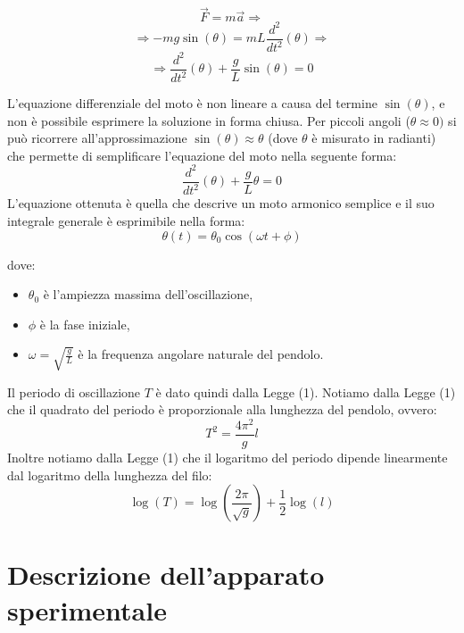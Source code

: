 \documentclass[11pt]{article}
\begin{document}
$$\overrightarrow{F}=m\overrightarrow{a}\Rightarrow$$
$$\Rightarrow-mg\sin(\theta)=mL\frac{d^2}{dt^2}(\theta)\Rightarrow$$
\begin{equation}
    \Rightarrow \frac{d^2}{dt^2}(\theta)+\frac{g}{L}\sin(\theta)=0
\end{equation}

L'equazione differenziale del moto è non lineare a causa del termine $\sin (\theta)$, e non è possibile esprimere la soluzione in forma chiusa. Per piccoli angoli ($\theta\approx 0)$ si può ricorrere all'approssimazione $\sin (\theta)\approx\theta$ (dove $\theta$ è misurato in radianti) che permette di semplificare l'equazione del moto nella seguente forma:
\begin{equation}
    \frac{d^2}{dt^2}(\theta)+\frac{g}{L}\theta=0
\end{equation}
L'equazione ottenuta è quella che descrive un moto armonico semplice e il suo integrale generale è esprimibile nella forma:
\begin{equation}
    \theta(t)=\theta_0 \cos(\omega t+\phi)
\end{equation}

dove:
\begin{itemize}
    \item \textbf{$\theta_0$} è l'ampiezza massima dell'oscillazione,
    \item \textbf{$\phi$} è la fase iniziale,
    \item \textbf{$\omega = \sqrt{\frac{g}{L}}$} è la frequenza angolare naturale del pendolo.
\end{itemize}
Il periodo di oscillazione $T$ è dato quindi dalla Legge (1). 
Notiamo dalla Legge (1) che il quadrato del periodo è proporzionale alla lunghezza del pendolo, ovvero:
\begin{equation}
    T^2=\frac{4\pi^2}{g}l
\end{equation}
Inoltre notiamo dalla Legge (1) che il logaritmo del periodo dipende linearmente dal logaritmo della lunghezza del filo:
\begin{equation}
    \log(T)=\log(\frac{2\pi}{\sqrt{g}})+\frac{1}{2}\log(l)
\end{equation}

\section{Descrizione dell'apparato sperimentale}
\end{document}
